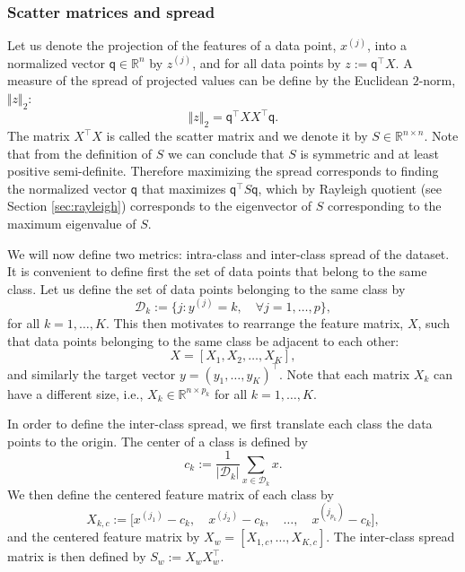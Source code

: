 \documentclass[11pt]{article}
\newcommand{\R}{\mathbb{R}}
\newcommand{\D}{\mathcal{D}}
\newcommand{\q}{\textsf{q}}
\newcommand{\norm}[1]{\Vert #1 \Vert}
\begin{document}
\subsubsection{Scatter matrices and spread}
Let us denote the projection of the features of a data point, $x^{(j)}$, into a normalized vector $\q \in \R^{n}$ by $z^{(j)}$, and for all data points by $z := \q^\top X$. A measure of the spread of projected values can be define by the Euclidean $2$-norm, $\norm{z}_2$:
\begin{equation}
	\norm{z}_2 = \q^\top X X^\top \q.
\end{equation}
The matrix $X^\top X$ is called the scatter matrix and we denote it by $S \in \R^{n\times n}$. Note that from the definition of $S$ we can conclude that $S$ is symmetric and at least positive semi-definite. Therefore maximizing the spread corresponds to finding the normalized vector $\q$ that maximizes $\q^\top S \q$, which by Rayleigh quotient (see Section \ref{sec:rayleigh}) corresponds to the eigenvector of $S$ corresponding to the maximum eigenvalue of $S$.

We will now define two metrics: intra-class and inter-class spread of the dataset. It is convenient to define first the set of data points that belong to the same class. Let us define the set of data points belonging to the same class by
\begin{equation}
	\D_k := \big\{ j : y^{(j)} = k, \quad \forall j=1,\dots,p \big\},
\end{equation}
for all $k = 1, \dots, K$. This then motivates to rearrange the feature matrix, $X$, such that data points belonging to the same class be adjacent to each other:
\begin{equation}
	X = [X_1, X_2, \dots, X_K],
\end{equation}
and similarly the target vector $y = (y_1, \dots, y_K)^\top$. Note that each matrix $X_k$ can have a different size, i.e.,  $X_k \in \R^{n \times p_k}$ for all $k = 1, \dots, K$.

In order to define the inter-class spread, we first translate each class the data points to the origin. The center of a class is defined by
\begin{equation}
	c_k := \frac{1}{|\D_k|} \sum_{x \in \D_k} x.
\end{equation}
We then define the centered feature matrix of each class by
\begin{equation}
	X_{k, c} := \Big[x^{(j_1)}-c_k, \quad x^{(j_2)}-c_k, \quad \dots, 
	\quad x^{(j_{p_k})}-c_k \Big],
\end{equation}
and the centered feature matrix by $X_w = [X_{1, c}, \dots, X_{K, c}]$.
The inter-class spread matrix is then defined by $S_w := X_w^{} X_w^{\top}$.
\end{document}
